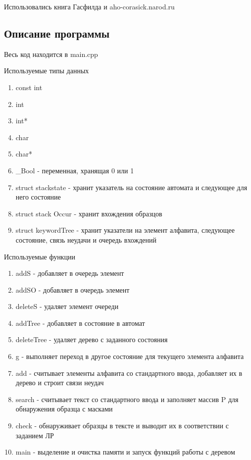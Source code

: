 \documentclass[12pt]{article}
\begin{document}
Использовались книга Гасфилда и aho-corasick.narod.ru

\subsection*{Описание программы}

Весь код находится в main.cpp

Используемые типы данных
\begin{enumerate}
\item const int
\item int
\item int*
\item char
\item char*
\item \_Bool - переменная, хранящая 0 или 1
\item struct stackstate - хранит указатель на состояние автомата и следующее для него состояние
\item struct stack Occur - хранит вхождения образцов
\item struct keywordTree - хранит указатели на элемент алфавита, следующее состояние, связь неудачи и очередь вхождений
\end{enumerate}

Используемые функции
\begin{enumerate}
\item addS - добавляет в очередь элемент
\item addSO - добавляет в очередь элемент
\item deleteS - удаляет элемент очереди
\item addTree - добавляет в состояние в автомат
\item deleteTree - удаляет дерево с заданного состояния
\item g - выполняет переход в другое состояние для текущего элемента алфавита
\item add - считывает элементы алфавита со стандартного ввода, добавляет их в дерево и строит связи неудач
\item search - считывает текст со стандартного ввода и заполняет массив P для обнаружения образца с масками
\item check - обнаруживает образцы в тексте и выводит их в соответствии с заданием ЛР
\item main - выделение и очистка памяти и запуск функций работы с деревом
 
\end{enumerate}
\end{document}
